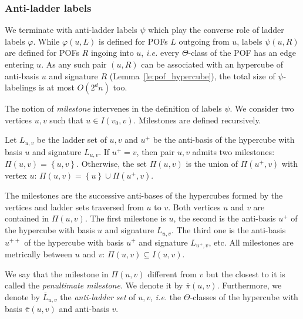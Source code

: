 \documentclass[a4paper,UKenglish,numberwithinsect,cleveref, autoref,anonymous]{lipics-v2021}
\newcommand{\set}[1]{\left\{ #1 \right\}}
\begin{document}
\subsubsection{Anti-ladder labels} \label{subsubsec:anti_ladder}

 We terminate with anti-ladder labels $\psi$ which play the converse role of ladder labels $\varphi$. While $\varphi(u,L)$ is defined for POFs $L$ outgoing from $u$, labels $\psi(u,R)$ are defined for POFs $R$ ingoing into $u$, {\em i.e.} every $\Theta$-class of the POF has an edge entering $u$. As any such pair $(u,R)$ can be associated with an hypercube of anti-basis $u$ and signature $R$ (Lemma~\ref{le:pof_hypercube}), the total size of $\psi$-labelings is at most $O(2^dn)$ too.

The notion of \textit{milestone} intervenes in the definition of labels $\psi$. We consider two vertices $u,v$ such that $u \in I(v_0,v)$. Milestones are defined recursively.

\begin{definition}[Milestones $\Pi(u,v)$]
Let $L_{u,v}$ be the ladder set of $u,v$ and $u^+$ be the anti-basis of the hypercube with basis $u$ and signature $L_{u,v}$.
If $u^+ = v$, then pair $u,v$ admits two milestones: $\Pi(u,v) = \set{u,v}$. Otherwise, the set $\Pi(u,v)$ is the union of $\Pi(u^+,v)$ with vertex $u$: $\Pi(u,v) = \set{u} \cup \Pi(u^+,v)$.
\label{def:milestones}
\end{definition}

The milestones are the successive anti-bases of the hypercubes formed by the vertices and ladder sets traversed from $u$ to $v$. Both vertices $u$ and $v$ are contained in $\Pi(u,v)$. The first milestone is $u$, the second is the anti-basis $u^+$ of the hypercube with basis $u$ and signature $L_{u,v}$. The third one is the anti-basis $u^{++}$ of the hypercube with basis $u^+$ and signature $L_{u^+,v}$, etc. All milestones are metrically between $u$ and $v$: $\Pi(u,v) \subseteq I(u,v)$. 

\begin{definition}
We say that the milestone in $\Pi(u,v)$ different from $v$ but the closest to it is called the \textit{penultimate milestone}. We denote it by $\overline{\pi}(u,v)$. Furthermore, we denote by $\overline{L}_{u,v}$ the \emph{anti-ladder set} of $u,v$, {\em i.e.} the $\Theta$-classes of the hypercube with basis $\overline{\pi}(u,v)$ and anti-basis $v$. 
\end{definition}
\end{document}
